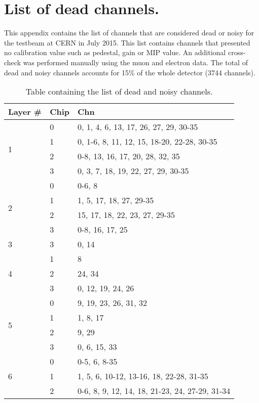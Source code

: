 \chapter{List of dead channels.}
\label{appendix:deadChn}

This appendix contains the list of channels that are considered dead or noisy for the testbeam at CERN in July 2015. This list contains channels that presented no calibration value such as pedestal, gain or MIP value. An additional cross-check was performed manually \cite{AmbraEnergy} using the muon and electron data. The total of dead and noisy channels accounts for 15\% of the whole detector (3744 channels).

\begin{table}[htb!]
  \centering
  \caption{Table containing the list of dead and noisy channels.}
  \label{table:DeadNoisyList}
  \begin{tabular}{@{} lll @{}}
    \toprule
    Layer \# & Chip & Chn\\
    \midrule
    \multirow{4}{*}{1} & 0 & 0, 1, 4, 6, 13, 17, 26, 27, 29, 30-35\\
    & 1 & 0, 1-6, 8, 11, 12, 15, 18-20, 22-28, 30-35\\
    & 2 & 0-8, 13, 16, 17, 20, 28, 32, 35\\
    & 3 & 0, 3, 7, 18, 19, 22, 27, 29, 30-35\\
    \midrule
    \multirow{4}{*}{2} & 0 & 0-6, 8\\
    & 1 & 1, 5, 17, 18, 27, 29-35\\
    & 2 & 15, 17, 18, 22, 23, 27, 29-35\\
    & 3 & 0-8, 16, 17, 25\\
    \midrule
    \multirow{1}{*}{3} & 3 & 0, 14\\
    \midrule
    \multirow{3}{*}{4} & 1 & 8\\
    & 2 & 24, 34\\
    & 3 & 0, 12, 19, 24, 26\\
    \midrule
    \multirow{4}{*}{5} & 0 & 9, 19, 23, 26, 31, 32\\
    & 1 & 1, 8, 17\\
    & 2 & 9, 29\\
    & 3 & 0, 6, 15, 33\\
    \midrule
    \multirow{4}{*}{6} & 0 & 0-5, 6, 8-35\\
    & 1 & 1, 5, 6, 10-12, 13-16, 18, 22-28, 31-35\\
    & 2 & 0-6, 8, 9, 12, 14, 18, 21-23, 24, 27-29, 31-34\\

\end{tabular}
\end{table}
